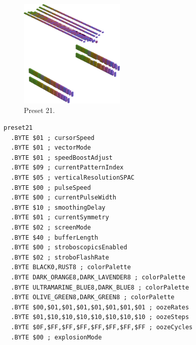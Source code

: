 \clearpage
\begin{minipage}[b]{0.48\linewidth}
\begin{figure}[H]                                                          
  \centering                                                             
  \begin{adjustbox}{width=5cm,center}                                   
  \includegraphics[width=5cm]{src/colorspace_presets/preset21-45.png}%
  \end{adjustbox}                                                        
\caption*{Preset 21.}                                           
\end{figure}                                                               
\end{minipage}
\hspace{0.1cm}
\begin{minipage}[b]{0.48\linewidth}                            
\begin{lstlisting}[basicstyle=\ttfamily\tiny]
preset21
  .BYTE $01 ; cursorSpeed
  .BYTE $01 ; vectorMode
  .BYTE $01 ; speedBoostAdjust
  .BYTE $09 ; currentPatternIndex
  .BYTE $05 ; verticalResolutionSPAC
  .BYTE $00 ; pulseSpeed
  .BYTE $00 ; currentPulseWidth
  .BYTE $10 ; smoothingDelay
  .BYTE $01 ; currentSymmetry
  .BYTE $02 ; screenMode
  .BYTE $40 ; bufferLength
  .BYTE $00 ; stroboscopicsEnabled
  .BYTE $02 ; stroboFlashRate
  .BYTE BLACK0,RUST8 ; colorPalette
  .BYTE DARK_ORANGE8,DARK_LAVENDER8 ; colorPalette
  .BYTE ULTRAMARINE_BLUE8,DARK_BLUE8 ; colorPalette
  .BYTE OLIVE_GREEN8,DARK_GREEN8 ; colorPalette
  .BYTE $00,$01,$01,$01,$01,$01,$01,$01 ; oozeRates
  .BYTE $01,$10,$10,$10,$10,$10,$10,$10 ; oozeSteps
  .BYTE $0F,$FF,$FF,$FF,$FF,$FF,$FF,$FF ; oozeCycles
  .BYTE $00 ; explosionMode
\end{lstlisting}
\end{minipage}

\vspace*{0.3cm}

